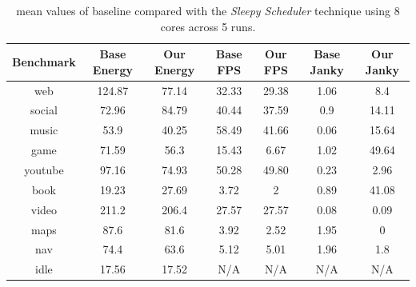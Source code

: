 \documentclass[conference]{IEEEtran}
\begin{document}
\begin{table}
\renewcommand{\arraystretch}{1.3}
\caption{mean values of baseline compared with the \emph{Sleepy Scheduler} technique using 8 cores across 5 runs.}
\label{tab:usecase}
\centering
\begin{tabular}{|c|c|c|c|c|c|c|}
\hline
\textbf{Benchmark} & \textbf{Base Energy} & \textbf{Our Energy} &  \textbf{Base FPS} & \textbf{Our FPS} & \textbf{Base Janky} & \textbf{Our Janky} \\
\hline
    web     & 124.87 &  77.14 & 32.33 & 29.38 & 1.06 & 8.4    \\
    social  & 72.96  &  84.79 & 40.44 & 37.59 & 0.9  & 14.11  \\ 
    music   & 53.9   &  40.25 & 58.49 & 41.66 & 0.06 & 15.64  \\
    game    & 71.59  & 56.3   & 15.43 & 6.67  & 1.02 & 49.64  \\
    youtube & 97.16  & 74.93  & 50.28 & 49.80 & 0.23 & 2.96   \\
    book    & 19.23  & 27.69  & 3.72  & 2     & 0.89 & 41.08  \\
    video   & 211.2  & 206.4  & 27.57 & 27.57 & 0.08 & 0.09   \\
    maps    &  87.6  & 81.6   & 3.92  & 2.52  & 1.95 & 0      \\
    nav     & 74.4   & 63.6   & 5.12  & 5.01  & 1.96 & 1.8      \\
    idle    & 17.56  & 17.52  & N/A   & N/A   & N/A  & N/A    \\


      \hline
\end{tabular}

\end{table}
\end{document}
